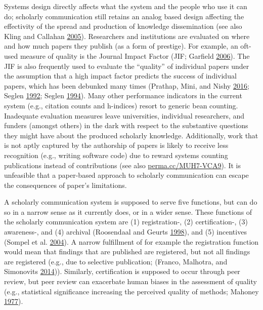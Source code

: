 \documentclass[a5paper]{book}
\begin{document}
Systems design directly affects what the system and the people who use
it can do; scholarly communication still retains an analog based design
affecting the effectivity of the spread and production of knowledge
dissemination (see also Kling and Callahan
\protect\hyperlink{ref-doi:10.1002ux2faris.1440370105}{2005}).
Researchers and institutions are evaluated on where and how much papers
they publish (as a form of prestige). For example, an oft-used measure
of quality is the Journal Impact Factor (JIF; Garfield
\protect\hyperlink{ref-doi:10.1001ux2fjama.295.1.90}{2006}). The JIF is
also frequently used to evaluate the \enquote{quality} of individual
papers under the assumption that a high impact factor predicts the
success of individual papers, which has been debunked many times
(Prathap, Mini, and Nishy
\protect\hyperlink{ref-doi:10.1007ux2fs11192-016-2034-y}{2016}; Seglen
\protect\hyperlink{ref-Seglen1992}{1992}; Seglen
\protect\hyperlink{ref-Seglen1994}{1994}). Many other performance
indicators in the current system (e.g., citation counts and h-indices)
resort to generic bean counting. Inadequate evaluation measures leave
universities, individual researchers, and funders (amongst others) in
the dark with respect to the substantive questions they might have about
the produced scholarly knowledge. Additionally, work that is not aptly
captured by the authorship of papers is likely to receive less
recognition (e.g., writing software code) due to reward systems counting
publications instead of contributions (see also
\href{https://perma.cc/MUH7-VCA9}{perma.cc/MUH7-VCA9}). It is unfeasible
that a paper-based approach to scholarly communication can escape the
consequences of paper's limitations.

A scholarly communication system is supposed to serve five functions,
but can do so in a narrow sense as it currently does, or in a wider
sense. These functions of the scholarly communication system are (1)
registration-, (2) certification-, (3) awareness-, and (4) archival
(Roosendaal and Geurts \protect\hyperlink{ref-roosendaal1998}{1998}),
and (5) incentives (Sompel et al.
\protect\hyperlink{ref-doi:10.1045ux2fseptember2004-vandesompel}{2004}).
A narrow fulfillment of for example the registration function would mean
that findings that are published are registered, but not all findings
are registered (e.g., due to selective publication; (Franco, Malhotra,
and Simonovits
\protect\hyperlink{ref-doi:10.1126ux2fscience.1255484}{2014})).
Similarly, certification is supposed to occur through peer review, but
peer review can exacerbate human biases in the assessment of quality
(e.g., statistical significance increasing the perceived quality of
methods; Mahoney
\protect\hyperlink{ref-doi:10.1007ux2fbf01173636}{1977}).
\end{document}
